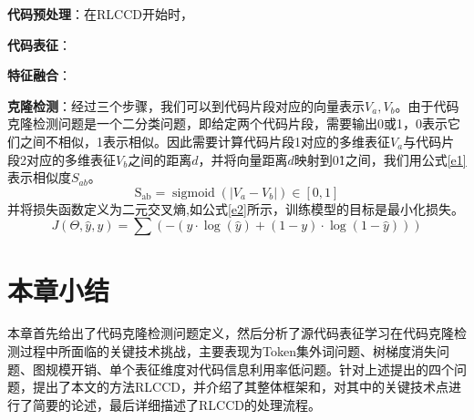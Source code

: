 \textbf{代码预处理}：在RLCCD开始时，

\textbf{代码表征}：

\textbf{特征融合}：

\textbf{克隆检测}：经过三个步骤，我们可以到代码片段对应的向量表示$V_{a},V_{b}$。由于代码克隆检测问题是一个二分类问题，即给定两个代码片段，需要输出0或1，0表示它们之间不相似，1表示相似。因此需要计算代码片段1对应的多维表征$V_{a}$与代码片段2对应的多维表征$V_{b}$之间的距离$d$，并将向量距离$d$映射到0\~1之间，我们用公式\ref{e1}表示相似度$S_{ab}$。
\begin{equation}\label{e1}
    \mathrm{S_{ab}}=\operatorname{sigmoid}\left(\left|V_{a}-V_{b}\right|\right) \in[0,1]
\end{equation}
并将损失函数定义为二元交叉熵,如公式\ref{e2}所示，训练模型的目标是最小化损失。
\begin{equation}\label{e2}
    J(\Theta, \hat{y}, y)=\sum(-(y \cdot \log (\hat{y})+(1-y) \cdot \log (1-\hat{y})))
\end{equation}

\section{本章小结}
\label{sec:Summary2}
本章首先给出了代码克隆检测问题定义，然后分析了源代码表征学习在代码克隆检测过程中所面临的关键技术挑战，主要表现为Token集外词问题、树梯度消失问题、图规模开销、单个表征维度对代码信息利用率低问题。针对上述提出的四个问题，提出了本文的方法RLCCD，并介绍了其整体框架和，对其中的关键技术点进行了简要的论述，最后详细描述了RLCCD的处理流程。
